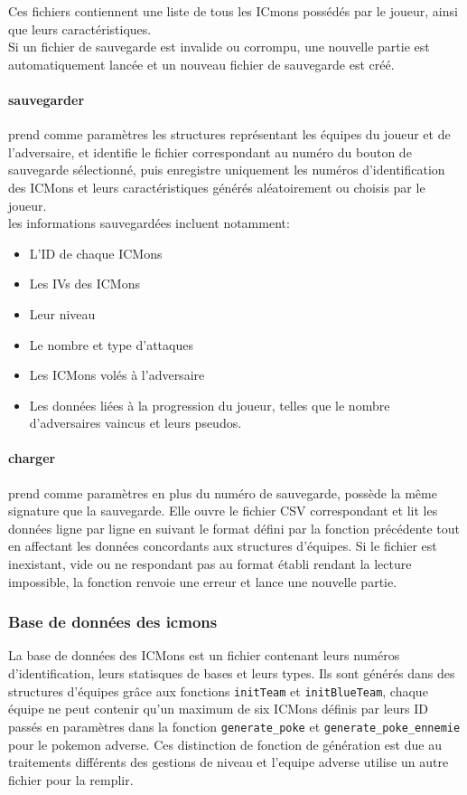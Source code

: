 \documentclass[12pt,a4paper, twoside]{article}
\begin{document}
     Ces fichiers contiennent une liste de tous les ICmons possédés par le joueur, ainsi que leurs caractéristiques.\\
     Si un fichier de sauvegarde est invalide ou corrompu, une nouvelle partie est automatiquement lancée et un nouveau fichier de sauvegarde est créé.\\

    \paragraph{sauvegarder}prend comme paramètres les structures représentant les équipes du joueur et de l'adversaire,
    et identifie le fichier correspondant au numéro du bouton de sauvegarde sélectionné, puis enregistre uniquement les numéros d'identification des ICMons et leurs caractéristiques générés aléatoirement ou choisis par le joueur.\\
    les informations sauvegardées incluent notamment:
    \begin{itemize}
        \item L'ID de chaque ICMons
        \item Les IVs des ICMons
        \item Leur niveau
        \item Le nombre et type d'attaques
        \item Les ICMons volés à l'adversaire
        \item Les données liées à la progression du joueur, telles que le nombre d’adversaires vaincus et leurs pseudos.
    \end{itemize}
    \paragraph{charger}prend comme paramètres en plus du numéro de sauvegarde, possède la même signature que la sauvegarde. Elle ouvre le fichier CSV
    correspondant et lit les données ligne par ligne en suivant le format défini par la fonction précédente tout en affectant les données concordants aux structures d'équipes. Si le fichier est inexistant, vide ou ne respondant pas au format établi rendant la lecture impossible, la fonction renvoie une erreur et lance une nouvelle partie.

    \subsubsection{Base de données des icmons}
    La base de données des ICMons est un fichier contenant leurs numéros d'identification, leurs statisques de bases et leurs types.
    Ils sont générés dans des structures d'équipes grâce aux fonctions \texttt{initTeam} et \texttt{initBlueTeam}, chaque équipe ne peut contenir qu'un maximum de six ICMons définis par leurs ID passés en paramètres dans la fonction \texttt{generate\_poke} et \texttt{generate\_poke\_ennemie} pour le pokemon adverse. Ces distinction de fonction de génération est due au traitements différents des gestions de niveau et l'equipe adverse utilise un autre fichier pour la remplir.\\
\end{document}
